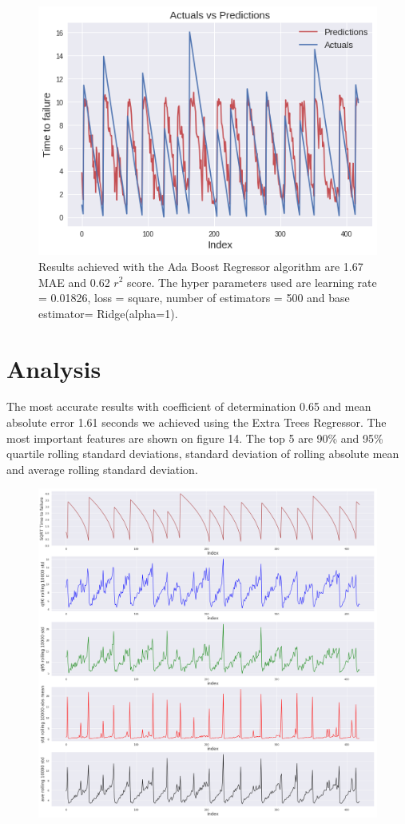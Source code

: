 \documentclass[]{llncs} %
\begin{document}
\begin{figure}[H]
	\centering
	\includegraphics[width=.9\linewidth]{results2}
	\caption{Results achieved with the Ada Boost Regressor algorithm are 1.67 MAE and 0.62 $r^2$ score. The hyper parameters used are learning rate = 0.01826, loss = square, number of estimators = 500 and base estimator= Ridge(alpha=1).}
	\label{fig:results2}
\end{figure}
\clearpage
\newpage
\section{Analysis}
The most accurate results with coefficient of determination 0.65 and mean absolute error 1.61 seconds we achieved using the Extra Trees Regressor. The most important features are shown on figure 14. The top 5 are 90\% and 95\% quartile rolling standard deviations, standard deviation of rolling absolute mean and average rolling standard deviation.
\begin{figure}[H]
	\centering
	\includegraphics[width=.9\linewidth]{analysis}
	\caption{}
	\label{fig:analysis}
\end{figure}
\end{document}
